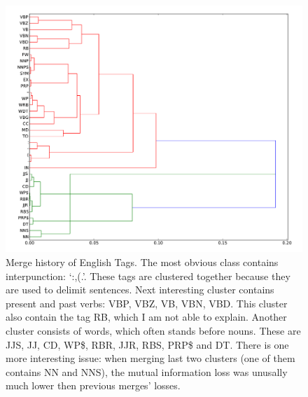 \documentclass[12pt,a4paper]{article}
\begin{document}
\begin{figure}[h!]
  \centering
  \includegraphics[width=\textwidth]{dendrogram_en_tags}

  \caption{Merge history of English Tags. The most obvious class contains
    interpunction: `:,(.'. These tags are clustered together because they are
    used to delimit sentences. Next interesting cluster contains present and
    past verbs: VBP, VBZ, VB, VBN, VBD. This cluster also contain the tag RB,
    which I am not able to explain. Another cluster consists of words, which
    often stands before nouns. These are JJS, JJ, CD, WP\$, RBR, JJR, RBS,
    PRP\$ and DT. There is one more interesting issue: when merging last two
    clusters (one of them contains NN and NNS), the mutual information loss was
    unusally much lower then previous merges' losses.  }

  \label{dendrogram_en_tags}
\end{figure}
\end{document}
